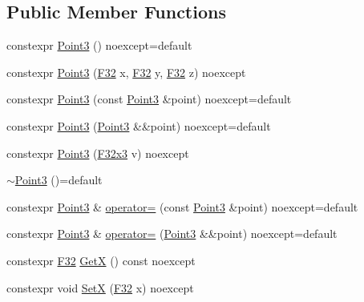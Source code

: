 \subsection*{Public Member Functions}
\begin{DoxyCompactItemize}
\item 
constexpr \mbox{\hyperlink{structmage_1_1_point3_a5615d9dddc6cedf47df9047fd23b7833}{Point3}} () noexcept=default
\item 
constexpr \mbox{\hyperlink{structmage_1_1_point3_ade2447542de93cfeeb7209cdfa3051e7}{Point3}} (\mbox{\hyperlink{namespacemage_aa97e833b45f06d60a0a9c4fc22ae02c0}{F32}} x, \mbox{\hyperlink{namespacemage_aa97e833b45f06d60a0a9c4fc22ae02c0}{F32}} y, \mbox{\hyperlink{namespacemage_aa97e833b45f06d60a0a9c4fc22ae02c0}{F32}} z) noexcept
\item 
constexpr \mbox{\hyperlink{structmage_1_1_point3_a1efeee54fe0401b52c90c8abe045ec37}{Point3}} (const \mbox{\hyperlink{structmage_1_1_point3}{Point3}} \&point) noexcept=default
\item 
constexpr \mbox{\hyperlink{structmage_1_1_point3_ae0c52aa09a4daec05a7b61eaed205866}{Point3}} (\mbox{\hyperlink{structmage_1_1_point3}{Point3}} \&\&point) noexcept=default
\item 
constexpr \mbox{\hyperlink{structmage_1_1_point3_ae92569a8f17984726f2d0a15ef183aa5}{Point3}} (\mbox{\hyperlink{namespacemage_a0fef5ab4e073c2d9ea876fefa3da4233}{F32x3}} v) noexcept
\item 
\mbox{\hyperlink{structmage_1_1_point3_a952151b6ff72b68569f95445c2ac2495}{$\sim$\+Point3}} ()=default
\item 
constexpr \mbox{\hyperlink{structmage_1_1_point3}{Point3}} \& \mbox{\hyperlink{structmage_1_1_point3_a84c14c12f0db37457c8b819e224a3482}{operator=}} (const \mbox{\hyperlink{structmage_1_1_point3}{Point3}} \&point) noexcept=default
\item 
constexpr \mbox{\hyperlink{structmage_1_1_point3}{Point3}} \& \mbox{\hyperlink{structmage_1_1_point3_a6c6e36ec4bbc80e3fe4f690475367482}{operator=}} (\mbox{\hyperlink{structmage_1_1_point3}{Point3}} \&\&point) noexcept=default
\item 
constexpr \mbox{\hyperlink{namespacemage_aa97e833b45f06d60a0a9c4fc22ae02c0}{F32}} \mbox{\hyperlink{structmage_1_1_point3_a94373be88e1cf76819b1c458860299dd}{GetX}} () const noexcept
\item 
constexpr void \mbox{\hyperlink{structmage_1_1_point3_a62c79c14704a8f53e571d693aafa8471}{SetX}} (\mbox{\hyperlink{namespacemage_aa97e833b45f06d60a0a9c4fc22ae02c0}{F32}} x) noexcept

\end{DoxyCompactItemize}
